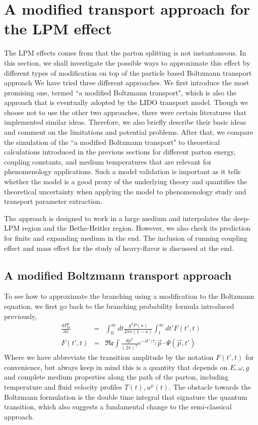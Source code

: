 \section{A modified transport approach for the LPM effect}
The LPM effects comes from that the parton splitting is not instantaneous.
In this section, we shall investigate the possible ways to approximate this effect by different types of modification on top of the particle based Boltzmann transport approach
We have tried three different approaches. 
We first introduce the most promising one, termed ``a modified Boltzmann transport", which is also the approach that is eventually adopted by the LIDO transport model.
Though we choose not to use the other two approaches, there were certain literatures that implemented similar ideas.
Therefore, we also briefly describe their basic ideas and comment on the limitations and potential problems.
After that, we compare the simulation of the ``a modified Boltzmann transport" to theoretical calculations introduced in the previous sections for different parton energy, coupling constants, and medium temperatures that are relevant for phenomenology applications.
Such a model validation is important as it tells whether the model is a good proxy of the underlying theory and quantifies the theoretical uncertainty when applying the model to phenomenology study and transport parameter extraction.

The approach is designed to work in a large medium and interpolates the deep-LPM region and the Bethe-Heitler region.
However, we also check its prediction for finite and expanding medium in the end.
The inclusion of running coupling effect and mass effect for the study of heavy-flavor is discussed at the end.

\subsection{A modified Boltzmann transport approach}
To see how to approximate the branching using a modification to the Boltzmann equation, we first go back to the branching probability formula introduced previously,
\begin{eqnarray}
\frac{dP^{a}_{bc}}{dx} &=& \int_0^\infty dt \frac{g^2 P(x)}{2\pi x (1-x) } \int_t^\infty dt'  F(t', t)
\label{eq:full-theory}
\\
F(t', t) &=& \mathfrak{Re} \int \frac{dp^2}{(2\pi)^2} e^{-it'/\tau_f} \vec{p}\cdot \Psi(\vec{p}, t')
\end{eqnarray}
Where we have abbreviate the transition amplitude by the notation $F(t', t)$ for convenience, but always keep in mind this is a quantity that depends on $E, \omega, g$ and complete medium properties along the path of the parton, including temperature and fluid velocity profiles $T(t), u^\mu(t)$.
The obstacle towards the Boltzmann formulation is the double time integral that signature the quantum transition, which also suggests a fundamental change to the semi-classical approach.

